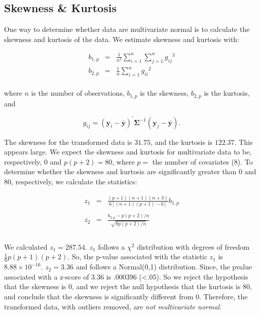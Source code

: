 \global\def\ds{\displaystyle}

  \subsection{Skewness \& Kurtosis}
    One way to determine whether data are multivariate normal is to calculate
    the skewness and kurtosis of the data. We estimate skewness and kurtosis
    with:

    \[
        \begin{array}{rcl}
          b_{1,p} &=& \frac{1}{n^2} 
                      \sum\limits_{i=1}^n\sum\limits_{j=1}^n {g_{ij}}^3 \\
          b_{2,p} &=& \frac{1}{n} \sum\limits_{i=1}^n {g_{ii}}^2\\
        \end{array}
    \]
    
    \noindent
    where $n$ is the number of observations, $b_{1,p}$ is the skewness,
    $b_{2,p}$ is the kurtosis, and 
    
    \[
      g_{ij} = (\bm y_i-\bm{\bar y})^\prime \bm\Sigma^{-1}(\bm y_j-\bm{\bar y}).
    \]
    
    The skewness for the transformed data is $31.75$, and the kurtosis is
    $122.37$. This appears large. We expect the skewness and kurtosis for
    multivariate data to be, respectively, $0$ and $p(p+2)=80$, where $p=$ the
    number of covariates (8). To determine whether the skewness and kurtosis are
    significantly greater than 0 and 80, respectively, we calculate the statistics:

    \[
      \begin{array}{rcl}
        z_1 &=& \frac{\ds(p+1)(n+1)(n+3)}{\ds6[(n+1)(p+1)-6]}b_{1,p}\\
        &&\\
        z_2 &=& \frac{\ds b_{2,p}-p(p+2)/n}
                     {\ds \sqrt{8p(p+2)/n}} \\
        &&\\
      \end{array}
    \]

    We calculated $z_1 = 287.54$. $z_1$ follows a $\chi^2$ distribution with
    degrees of freedom $\frac{1}{6}p(p+1)(p+2)$. So, the p-value associated
    with the statistic $z_1$ is $8.88 \times 10^{-16}$. $z_2=3.36$ and follows
    a Normal(0,1) distribution. Since, the pvalue associated with a z-score of
    3.36 is .000396 (<.05).  So we reject the hypothesis that the skewness is
    0, and we reject the null hypothesis that the kurtosis is 80, and conclude
    that the skewness is significantly different from 0.  Therefore, the
    transformed data, with outliers removed, are \emph{not multivariate
    normal}. 
